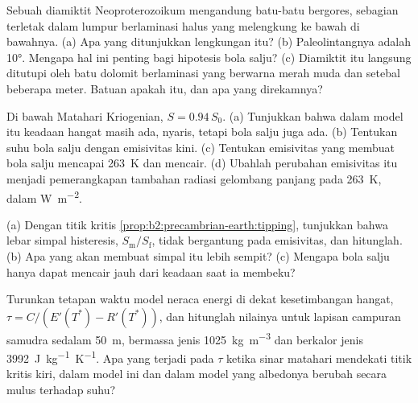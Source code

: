 \begin{exercise}[$\star\star$]\label{exo:b2:precambrian-earth:9}
Sebuah diamiktit Neoproterozoikum mengandung batu-batu bergores, sebagian terletak dalam lumpur berlaminasi halus
yang melengkung ke bawah di bawahnya. (a) Apa yang ditunjukkan lengkungan itu? (b) Paleolintangnya adalah
\ang{10}. Mengapa hal ini penting bagi hipotesis bola salju? (c) Diamiktit itu langsung ditutupi oleh
batu dolomit berlaminasi yang berwarna merah muda dan setebal beberapa meter. Batuan apakah itu, dan apa yang direkamnya?
\end{exercise}

\begin{exercise}[$\star\star\star$]\label{exo:b2:precambrian-earth:10}
Di bawah Matahari Kriogenian, $S = 0.94\,S_0$. (a) Tunjukkan bahwa dalam model itu keadaan hangat masih
ada, nyaris, tetapi bola salju juga ada. (b) Tentukan suhu bola salju dengan
emisivitas kini. (c) Tentukan emisivitas yang membuat bola salju mencapai \qty{263}{K} dan
mencair. (d) Ubahlah perubahan emisivitas itu menjadi pemerangkapan tambahan radiasi gelombang panjang pada
\qty{263}{K}, dalam \unit{W.m^{-2}}.
\end{exercise}

\begin{exercise}[$\star\star\star$]\label{exo:b2:precambrian-earth:11}
(a) Dengan titik kritis \cref{prop:b2:precambrian-earth:tipping}, tunjukkan bahwa lebar
simpal histeresis, $S_{\text{m}}/S_{\text{f}}$, tidak bergantung pada emisivitas, dan
hitunglah. (b) Apa yang akan membuat simpal itu lebih sempit? (c) Mengapa bola salju hanya dapat mencair jauh dari
keadaan saat ia membeku?
\end{exercise}

\begin{exercise}[$\star\star\star$]\label{exo:b2:precambrian-earth:12}
Turunkan tetapan waktu model neraca energi di dekat kesetimbangan hangat, $\tau =
C/(E'(T^*) - R'(T^*))$, dan hitunglah nilainya untuk lapisan campuran samudra sedalam \qty{50}{m}, bermassa jenis
\qty{1025}{kg.m^{-3}} dan berkalor jenis \qty{3992}{J.kg^{-1}.K^{-1}}. Apa yang terjadi pada $\tau$ ketika
sinar matahari mendekati titik kritis kiri, dalam model ini dan dalam model yang albedonya berubah
secara mulus terhadap suhu?
\end{exercise}


